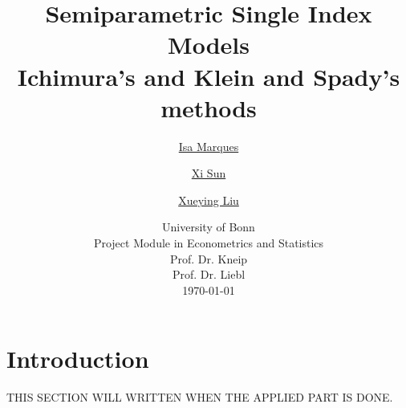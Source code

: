 \documentclass[a4paper]{article}
\begin{document}
	\title{
	\vspace{1cm}
	\Huge \textbf{ Semiparametric Single Index Models }\\ \Large Ichimura's and Klein and Spady's methods \\
	}
	
	\vspace{1cm}
	
	
	\author{\Large \href{mailto:first.student@smail.fh-koeln.de}{Isa Marques}\and \Large \href{mailto:second.student@smail.fh-koeln.de}{Xi Sun} \and \Large \href{mailto:second.student@smail.fh-koeln.de}{Xueying Liu}
	\vspace{1cm}}
	
	\date{
	\large University of Bonn \\ Project Module in Econometrics and Statistics\\ 
	\vspace{0.8cm}
	\large Prof. Dr. Kneip \\
	\large Prof. Dr. Liebl \\
	\vspace{1cm}
	\today
	}

	\maketitle
	\setlength{\parindent}{0pt}

\vspace{2cm}
\begin{abstract}


\end{abstract}
	\newpage
	\tableofcontents
	\newpage
	
\section{Introduction} %
\label{sec:introduction}
THIS SECTION WILL WRITTEN WHEN THE APPLIED PART IS DONE.



\end{document}
